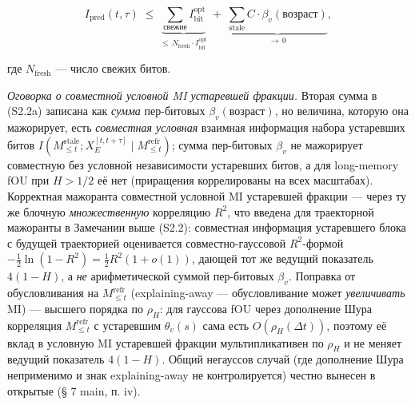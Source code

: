 \documentclass[12pt]{iopart}
\begin{document}
\begin{equation}I_{\text{pred}}(t,\tau) \;\le\; \underbrace{\sum_{\text{свежие}} I^{\text{opt}}_{\text{bit}}}_{\le\, N_{\text{fresh}}\cdot I^{\text{opt}}_{\text{bit}}} \;+\; \underbrace{\sum_{\text{stale}} C\cdot\beta_v(\text{возраст})}_{\to\, 0}, \tag{S2.2a}\end{equation}



где \(N_{\text{fresh}}\) --- число свежих битов.



\emph{Оговорка о совместной условной MI устаревшей фракции.} Вторая сумма в (S2.2a) записана как \emph{сумма} пер-битовых \(\beta_v(\text{возраст})\), но величина, которую она мажорирует, есть \emph{совместная условная} взаимная информация набора устаревших битов \(I(M_{\le t}^{\text{stale}}; X_E^{[t,t+\tau]}\mid M_{\le t}^{\text{refr}})\); сумма пер-битовых \(\beta_v\) не мажорирует совместную без условной независимости устаревших битов, а для long-memory fOU при \(H > 1/2\) её нет (приращения коррелированы на всех масштабах). Корректная мажоранта совместной условной MI устаревшей фракции --- через ту же блочную \emph{множественную} корреляцию \(R^2\), что введена для траекторной мажоранты в Замечании выше (S2.2): совместная информация устаревшего блока с будущей траекторией оценивается совместно-гауссовой \(R^2\)-формой \(-\tfrac12\ln(1-R^2) = \tfrac12 R^2(1+o(1))\), дающей тот же ведущий показатель \(4(1-H)\), а \emph{не} арифметической суммой пер-битовых \(\beta_v\). Поправка от обусловливания на \(M_{\le t}^{\text{refr}}\) (explaining-away --- обусловливание может \emph{увеличивать} MI) --- высшего порядка по \(\rho_H\): для гауссова fOU через дополнение Шура корреляция \(M_{\le t}^{\text{refr}}\) с устаревшим \(\theta_v(s)\) сама есть \(O(\rho_H(\Delta t))\), поэтому её вклад в условную MI устаревшей фракции мультипликативен по \(\rho_H\) и не меняет ведущий показатель \(4(1-H)\). Общий негауссов случай (где дополнение Шура неприменимо и знак explaining-away не контролируется) честно вынесен в открытые (§ 7 main, п. iv).
\end{document}
